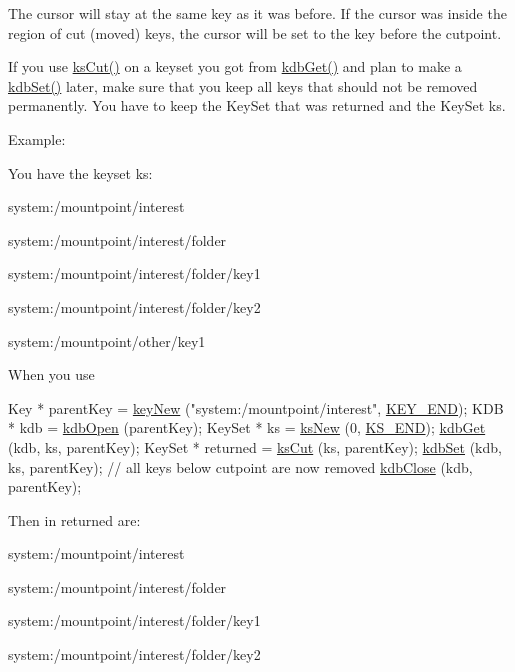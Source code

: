 The cursor will stay at the same key as it was before. If the cursor was inside the region of cut (moved) keys, the cursor will be set to the key before the cutpoint.

If you use \hyperlink{group__keyset_ga6b00cf82b59af4d883a9bad6cf4a4a4a}{ks\+Cut()} on a keyset you got from \hyperlink{group__kdb_ga28e385fd9cb7ccfe0b2f1ed2f62453a1}{kdb\+Get()} and plan to make a \hyperlink{group__kdb_ga11436b058408f83d303ca5e996832bcf}{kdb\+Set()} later, make sure that you keep all keys that should not be removed permanently. You have to keep the Key\+Set that was returned and the Key\+Set {\ttfamily ks}.

\begin{DoxyParagraph}{Example\+:}

\end{DoxyParagraph}
You have the keyset {\ttfamily ks\+:} 
\begin{DoxyItemize}
\item {\ttfamily system\+:/mountpoint/interest} 
\item {\ttfamily system\+:/mountpoint/interest/folder} 
\item {\ttfamily system\+:/mountpoint/interest/folder/key1} 
\item {\ttfamily system\+:/mountpoint/interest/folder/key2} 
\item {\ttfamily system\+:/mountpoint/other/key1} 
\end{DoxyItemize}

When you use 
\begin{DoxyCodeInclude}
        Key * parentKey = \hyperlink{group__key_gad23c65b44bf48d773759e1f9a4d43b89}{keyNew} (\textcolor{stringliteral}{"system:/mountpoint/interest"}, \hyperlink{group__key_gga9b703ca49f48b482def322b77d3e6bc8aa8adb6fcb92dec58fb19410eacfdd403}{KEY\_END});
        KDB * kdb = \hyperlink{group__kdb_ga6808defe5870f328dd17910aacbdc6ca}{kdbOpen} (parentKey);
        KeySet * ks = \hyperlink{group__keyset_ga671e1aaee3ae9dc13b4834a4ddbd2c3c}{ksNew} (0, \hyperlink{group__keyset_ga7a28fce3773b2c873c94ac80b8b4cd54}{KS\_END});
        \hyperlink{group__kdb_ga28e385fd9cb7ccfe0b2f1ed2f62453a1}{kdbGet} (kdb, ks, parentKey);
        KeySet * returned = \hyperlink{group__keyset_ga6b00cf82b59af4d883a9bad6cf4a4a4a}{ksCut} (ks, parentKey);
        \hyperlink{group__kdb_ga11436b058408f83d303ca5e996832bcf}{kdbSet} (kdb, ks, parentKey); \textcolor{comment}{// all keys below cutpoint are now removed}
        \hyperlink{group__kdb_gadb54dc9fda17ee07deb9444df745c96f}{kdbClose} (kdb, parentKey);
\end{DoxyCodeInclude}
 Then in {\ttfamily returned} are\+:
\begin{DoxyItemize}
\item {\ttfamily system\+:/mountpoint/interest} 
\item {\ttfamily system\+:/mountpoint/interest/folder} 
\item {\ttfamily system\+:/mountpoint/interest/folder/key1} 
\item {\ttfamily system\+:/mountpoint/interest/folder/key2} 
\end{DoxyItemize}

